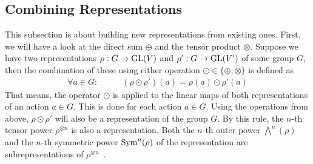 \subsection{Combining Representations}

This subsection is about building new representations from existing ones.
First, we will have a look at the direct sum $\oplus$ and the tensor product $\otimes$.
Suppose we have two representations $\rho: G \to \operatorname{GL}(V)$ and $\rho': G \to \operatorname{GL}(V')$ of some group $G$, then the combination of these using either operation $\odot \in \{\oplus, \otimes\}$ is defined as
\begin{align*}
    \forall a \in G: \qquad & (\rho \odot \rho')(a) = \rho(a) \odot \rho'(a)
\end{align*}
That means, the operator $\odot$ is applied to the linear maps of both representations of an action $a \in G$.
This is done for each action $a \in G$.
Using the operations from above, $\rho \odot \rho'$ will also be a representation of the group $G$.
By this rule, the $n$-th tensor power $\rho^{\otimes n}$ is also a representation.
Both the $n$-th outer power $\bigwedge^n(\rho)$ and the $n$-th symmetric power $\operatorname{Sym}^n(\rho)$ of the representation are subrepresentations of $\rho^{\otimes n}$~\cite{fulton2013}.

